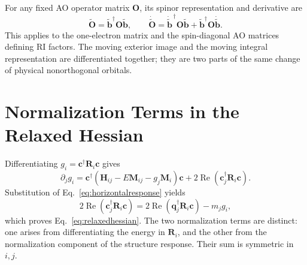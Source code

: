 \documentclass[12pt]{article}
\begin{document}
For any fixed AO operator matrix \(\mathbf O\), its spinor representation and derivative are
\begin{equation}
 \widetilde{\mathbf O}=\widetilde{\mathbf b}^\dagger\mathbf O\widetilde{\mathbf b},
 \qquad
 \dot{\widetilde{\mathbf O}}=
 \dot{\widetilde{\mathbf b}}^{\,\dagger}\mathbf O\widetilde{\mathbf b}
 +\widetilde{\mathbf b}^\dagger\mathbf O\dot{\widetilde{\mathbf b}}.
 \label{eq:operatortransformderivative}
\end{equation}
This applies to the one-electron matrix and the spin-diagonal AO matrices defining RI factors. The moving exterior image and the moving integral representation are differentiated together; they are two parts of the same change of physical nonorthogonal orbitals.

\section{Normalization Terms in the Relaxed Hessian}

Differentiating \(g_i=\mathbf c^\dagger\mathbf R_i\mathbf c\) gives
\begin{equation}
 \partial_jg_i=
 \mathbf c^\dagger(\mathbf H_{ij}-E\mathbf M_{ij}-g_j\mathbf M_i)\mathbf c
 +2\operatorname{Re}(\mathbf c_j^\dagger\mathbf R_i\mathbf c).
\end{equation}
Substitution of Eq.~\eqref{eq:horizontalresponse} yields
\begin{equation}
 2\operatorname{Re}(\mathbf c_j^\dagger\mathbf R_i\mathbf c)
 =2\operatorname{Re}(\mathbf q_j^\dagger\mathbf R_i\mathbf c)-m_jg_i,
\end{equation}
which proves Eq.~\eqref{eq:relaxedhessian}. The two normalization terms are distinct: one arises from differentiating the energy in \(\mathbf R_i\), and the other from the normalization component of the structure response. Their sum is symmetric in \(i,j\).
\end{document}
